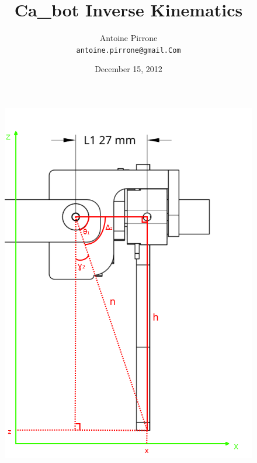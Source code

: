 \documentclass[12pt,fleqn,leqno,letterpaper]{article}
\title{Ca\_bot Inverse Kinematics}
\author{Antoine Pirrone\\
  \small{\texttt{antoine.pirrone@gmail.Com}}
}
\date{December 15, 2012}
\begin{document}
\maketitle

\begin{figure}[h]  
  \includegraphics[scale=0.35]{assets/front_annotated.png}

\end{figure}
\end{document}
